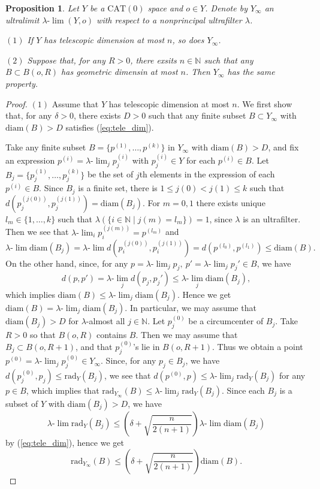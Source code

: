 \documentclass[12pt]{amsart}
\numberwithin{equation}{section}
\theoremstyle{plain}
\newtheorem{Proposition}[Theorem]{Proposition}
\theoremstyle{definition}
\theoremstyle{remark}
\newcommand{\N}{{\mathbb N}}
\newcommand{\diam}[1]{\mathrm{diam}(#1)}
\newcommand{\rad}[2]{\mathrm{rad}_{#1}({#2})}
\newcommand{\cat}[1]{\mathrm{CAT}(#1)}
\newcommand{\ulim}{\lambda{\text{-}}\!\lim}
\begin{document}
\begin{Proposition}
 \label{prop:dimension_of_ulim}
 Let $Y$ be a $\cat{0}$ space and $o \in Y$.  Denote by
 $Y_{\infty}$ an ultralimit $\ulim (Y,o)$ with respect to a
 nonprincipal ultrafilter $\lambda$. 
 
 $(1)$ If $Y$ has telescopic dimension at most $n$, so does
 $Y_{\infty}$. 

 $(2)$ Suppose that, for any $R>0$, there exsits $n \in \N$ such that
 any $B \subset B(o, R)$ has geometric dimensin at most $n$. 
 Then $Y_{\infty}$ has the same property. 
\end{Proposition}

\begin{proof}
 $(1)$ Assume that $Y$ has telescopic dimension at most $n$. 
 We first show that, for any $\delta>0$, there exists $D>0$ such that any
 finite subset $B \subset Y_{\infty}$ with $\diam{B}>D$ satisfies
 (\ref{eq:tele_dim}). 

 Take any finite subset $B =\{p^{(1)}, \dots, p^{(k)}\}$ in
 $Y_{\infty}$ with $\diam{B}>D$, 
 and fix an expression $p^{(i)}=\ulim_j p^{(i)}_j$ with $p^{(i)}_j\in Y$
 for each $p^{(i)} \in B$. 
 Let $B_j=\{p^{(1)}_j, \dots, p^{(k)}_j\}$ be the set of $j$th elements
 in the expression of each $p^{(i)} \in B$. 
 Since $B_j$ is a finite set, there is $1\leq j(0)< j(1) \leq k$ such
 that $d(p^{(j(0))}_{j}, p^{(j(1))}_{j})=\diam{B_j}$. 
 For $m=0,1$ there exists unique $l_m \in \{1, \dots, k\}$ such that
 $\lambda(\{i \in \N \mid  j(m)=l_m\}) = 1$, 
 since $\lambda$ is an ultrafilter.  
 Then we see that  $\ulim_i p^{(j(m))}_{i}=p^{(l_m)}$ and 
\begin{equation*}
 \ulim \diam{B_j}=\ulim
  d(p^{(j(0))}_i,p^{(j(1))}_i)=d(p^{(l_0)},p^{(l_1)})
  \leq \diam{B}.  
\end{equation*} 
 On the other hand, since, for any 
 $p=\ulim_j p_j,\ p'= \ulim_j p_j' \in B$,
 we have 
\begin{equation*}
 d(p,p') = \ulim_j d(p_j, p_j') \leq \ulim_j \diam{B_j}, 
\end{equation*}
 which implies $\diam{B} \leq \ulim_j \diam{B_j}$.  
 Hence we get $\diam{B}= \ulim_j \diam{B_j}$. 
 In particular, we may assume that $\diam{B_j}> D$ for $\lambda$-almost
 all $j \in \N$. Let $p^{(0)}_j$ be a circumcenter of $B_j$.  
 Take $R>0$ so that $B(o, R)$ contains $B$.  Then we may assume that
 $B_j \subset B(o, R+1)$, and that $p^{(0)}_j$'s lie in $B(o,R+1)$. 
 Thus we obtain a point
 $p^{(0)}= \ulim_j p^{(0)}_j \in Y_{\infty}$. 
 Since, for any $p_j \in B_j$, we have 
 $d(p^{(0)}_j, p_j) \leq \rad{Y}{B_j}$, we see that 
 $d(p^{(0)},p) \leq \ulim_j \rad{Y}{B_j}$ for any 
 $p \in B$, which implies that
 $\rad{Y_{\infty}}{B} \leq  \ulim_j \rad{Y}{B_j}$. 
 Since each $B_j$ is a subset of $Y$ with $\diam{B_j}>D$, we
 have
 \begin{equation*}
  \ulim \rad{Y}{B_j}
   \leq \left( \delta + \sqrt{\frac{n}{2(n+1)}}\right)
  \ulim \diam{B_j}
 \end{equation*}
 by (\ref{eq:tele_dim}), hence we get
 \begin{equation}
 \label{eq:finite_set}
 \rad{Y_{\infty}}{B} 
  \leq \left( \delta + \sqrt{\frac{n}{2(n+1)}}\right) \diam{B}. 
\end{equation}


\end{proof}
\end{document}
